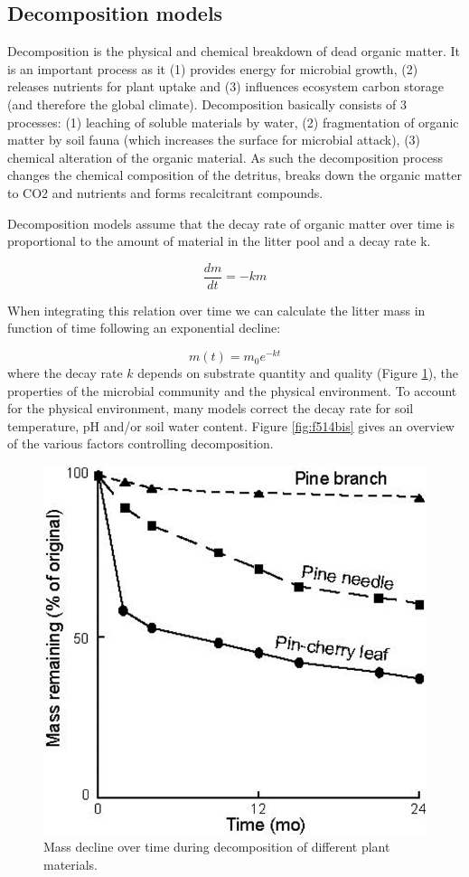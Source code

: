 \documentclass[12pt,oneside]{book}
\begin{document}
\subsection{Decomposition models}\label{decomposition-models}

Decomposition is the physical and chemical breakdown of dead organic
matter. It is an important process as it (1) provides energy for
microbial growth, (2) releases nutrients for plant uptake and (3)
influences ecosystem carbon storage (and therefore the global climate).
Decomposition basically consists of 3 processes: (1) leaching of soluble
materials by water, (2) fragmentation of organic matter by soil fauna
(which increases the surface for microbial attack), (3) chemical
alteration of the organic material. As such the decomposition process
changes the chemical composition of the detritus, breaks down the
organic matter to CO2 and nutrients and forms recalcitrant compounds.

Decomposition models assume that the decay rate of organic matter over
time is proportional to the amount of material in the litter pool and a
decay rate k.

\[\frac{dm}{dt} = -k m \]

When integrating this relation over time we can calculate the litter
mass in function of time following an exponential decline:

\[m(t) = m_0 e^{-kt} \] where the decay rate \(k\) depends on substrate
quantity and quality (Figure \ref{fig:f514}), the properties of the
microbial community and the physical environment. To account for the
physical environment, many models correct the decay rate for soil
temperature, pH and/or soil water content. Figure \ref{fig:f514bis}
gives an overview of the various factors controlling decomposition.

\begin{figure}

{\centering \includegraphics[width=0.8\linewidth]{figures/chap5/f514_leaf_decomp} 

}

\caption{Mass decline over time during decomposition of different plant materials.}\label{fig:f514}
\end{figure}
\end{document}
